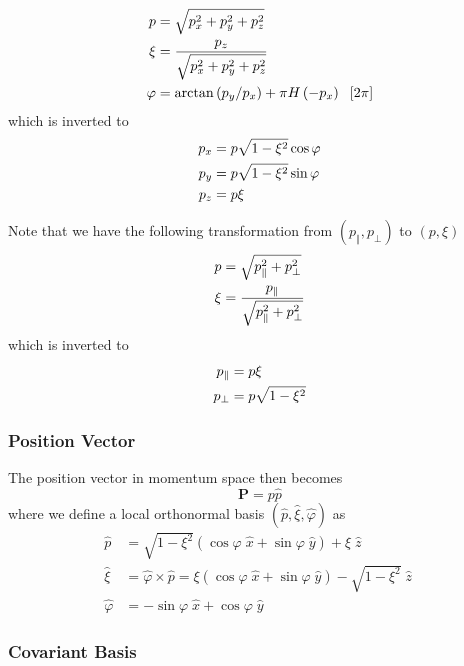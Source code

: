\begin{align}
p & =\sqrt{p_{x}^{2}+p_{y}^{2}+p_{z}^{2}}  \label{pxidef} \\
\xi & =\frac{p_{z}}{\sqrt{p_{x}^{2}+p_{y}^{2}+p_{z}^{2}}} \\
\varphi & =\arctan\left( p_{y}/p_{x}\right) +\pi H\left( -p_{x}\right) \;\ 
\left[ 2\pi\right]  \notag
\end{align}
which is inverted to 
\begin{align}
p_{x} & =p\sqrt{1-\xi^{2}}\cos\varphi \\
p_{y} & =p\sqrt{1-\xi^{2}}\sin\varphi  \notag \\
p_{z} & =p\xi  \notag
\end{align}

Note that we have the following transformation from $\left(
p_{\Vert},p_{\bot}\right) $ to $\left( p,\xi\right) $%
\begin{align}
p & =\sqrt{p_{\Vert}^{2}+p_{\bot}^{2}}  \label{pxi} \\
\xi & =\frac{p_{\Vert}}{\sqrt{p_{\Vert}^{2}+p_{\bot}^{2}}}  \notag
\end{align}
which is inverted to 
\begin{align}
p_{\Vert} & =p\xi  \label{pparpperp} \\
p_{\bot} & =p\sqrt{1-\xi^{2}}  \notag
\end{align}

\subsubsection{Position Vector}

The position vector in momentum space then becomes 
\begin{equation}
\mathbf{P}=p\widehat{p}
\end{equation}
where we define a local orthonormal basis $\left( \widehat{p},\widehat{\xi },%
\widehat{\varphi}\right) $ as 
\begin{align}
\widehat{p} & =\sqrt{1-\xi^{2}}\left( \cos\varphi\;\widehat{x}+\sin \varphi\;%
\widehat{y}\right) +\xi\;\widehat{z} \\
\widehat{\xi} & =\widehat{\varphi}\times\widehat{p}=\xi\left( \cos \varphi\;%
\widehat{x}+\sin\varphi\;\widehat{y}\right) -\sqrt{1-\xi^{2}}\;\widehat{z}\;
\\
\widehat{\varphi} & =-\sin\varphi\;\widehat{x}+\cos\varphi\;\widehat{y}
\end{align}

\subsubsection{Covariant Basis}

